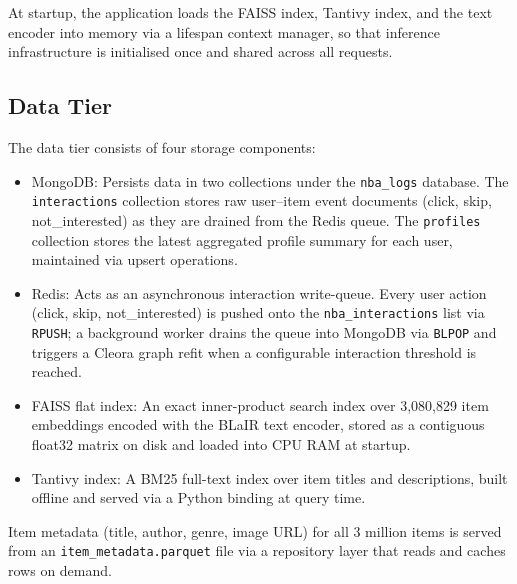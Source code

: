 At startup, the application loads the FAISS index, Tantivy index, and the text encoder into memory via a lifespan context manager, so that inference infrastructure is initialised once and shared across all requests.

\subsection{Data Tier}

The data tier consists of four storage components:

\begin{itemize}
    \item MongoDB: Persists data in two collections under the \texttt{nba\_logs} database. The \texttt{interactions} collection stores raw user–item event documents (click, skip, not\_interested) as they are drained from the Redis queue. The \texttt{profiles} collection stores the latest aggregated profile summary for each user, maintained via upsert operations.
    \item Redis: Acts as an asynchronous interaction write-queue. Every user action (click, skip, not\_interested) is pushed onto the \texttt{nba\_interactions} list via \texttt{RPUSH}; a background worker drains the queue into MongoDB via \texttt{BLPOP} and triggers a Cleora graph refit when a configurable interaction threshold is reached.
    \item FAISS flat index: An exact inner-product search index over 3{,}080{,}829 item embeddings encoded with the BLaIR text encoder, stored as a contiguous float32 matrix on disk and loaded into CPU RAM at startup.
    \item Tantivy index: A BM25 full-text index over item titles and descriptions, built offline and served via a Python binding at query time.
\end{itemize}

Item metadata (title, author, genre, image URL) for all 3 million items is served from an \texttt{item\_metadata.parquet} file via a repository layer that reads and caches rows on demand.

